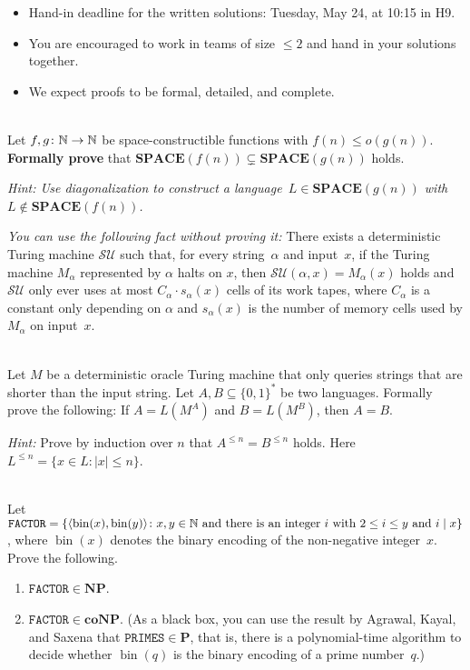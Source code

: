 \documentclass[english]{uebung_cs}
\begin{document}
\begin{itemize}
  \item Hand-in deadline for the written solutions: Tuesday, May 24, at 10:15 in H9.
  \item You are encouraged to work in teams of size $\le 2$ and hand in your solutions together.
  \item We expect proofs to be formal, detailed, and complete.
\end{itemize}

\begin{aufgabe}[Diagonalization]\mbox{}\\
    Let $f,g\colon\mathbb{N}\to\mathbb{N}$ be space-constructible functions with $f(n)\le o(g(n))$.
    \textbf{Formally prove} that $\mathbf{SPACE}(f(n))\subsetneq\mathbf{SPACE}(g(n))$ holds.

    \textit{Hint: Use diagonalization to construct a language~$L\in\mathbf{SPACE}(g(n))$ with $L\not\in\mathbf{SPACE}(f(n))$.}

    \textit{You can use the following fact without proving it:}
    There exists a deterministic Turing machine $\mathcal{SU}$ such that, for every string~$\alpha$ and input~$x$, if the Turing machine $M_\alpha$ represented by $\alpha$ halts on $x$, then
      $\mathcal{SU}(\alpha,x)=M_\alpha(x)$ holds and
      $\mathcal{SU}$ only ever uses at most $C_\alpha\cdot s_\alpha(x)$ cells of its work tapes, where $C_\alpha$ is a constant only depending on $\alpha$ and $s_\alpha(x)$ is the number of memory cells used by $M_\alpha$ on input~$x$.
\end{aufgabe}

\begin{aufgabe}[Oracles]\mbox{}\\
  Let $M$ be a deterministic oracle Turing machine that only queries strings 
  that are shorter than the input string.
  Let $A,B\subseteq\{0,1\}^\ast$ be two languages.
  Formally prove the following: If $A = L(M^A)$ and $B = L(M^B)$, then $A = B$.
  
  \emph{Hint:} Prove by induction over $n$ that $A^{\le n} = B^{\le n}$ holds. Here $L^{\le n}=\{x\in L\colon |x|\le n\}$.
\end{aufgabe}

\begin{aufgabe}\mbox{}\\
  Let $\mathtt{FACTOR}=\{\langle\operatorname{bin}(x),\operatorname{bin}(y)\rangle\colon \text{$x,y\in\mathbb{N}$ and there is an integer $i$ with $2\le i \le y$ and $i \mathrel{|} x$}\}$,
  where $\operatorname{bin}(x)$ denotes the binary encoding of the non-negative integer~$x$.
  Prove the following.
  \begin{enumerate}
    \item $\mathtt{FACTOR}\in\mathbf{NP}$.
    \item $\mathtt{FACTOR}\in\mathbf{coNP}$. (As a black box, you can use the result by Agrawal, Kayal, and Saxena that $\mathtt{PRIMES}\in\mathbf{P}$, that is, there is a polynomial-time algorithm to decide whether $\operatorname{bin}(q)$ is the binary encoding of a prime number~$q$.)
  \end{enumerate}
\end{aufgabe}
\end{document}
